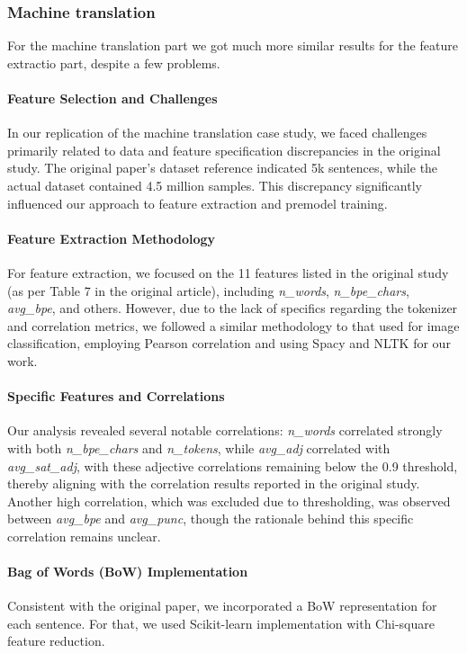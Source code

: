 \subsubsection{Machine translation}
For the machine translation part we got much more similar results for the feature extractio part, despite a few problems.

\paragraph{Feature Selection and Challenges}
In our replication of the machine translation case study, we faced challenges primarily related to data and feature specification discrepancies in the original study. The original paper's dataset reference indicated 5k sentences, while the actual dataset contained 4.5 million samples. This discrepancy significantly influenced our approach to feature extraction and premodel training.

\paragraph{Feature Extraction Methodology}
For feature extraction, we focused on the 11 features listed in the original study (as per Table 7 in the original article), including \textit{n\_words}, \textit{n\_bpe\_chars}, \textit{avg\_bpe}, and others. However, due to the lack of specifics regarding the tokenizer and correlation metrics, we followed a similar methodology to that used for image classification, employing Pearson correlation and using Spacy and NLTK for our work.

\paragraph{Specific Features and Correlations}
Our analysis revealed several notable correlations: \textit{n\_words} correlated strongly with both \textit{n\_bpe\_chars} and \textit{n\_tokens}, while \textit{avg\_adj} correlated with \textit{avg\_sat\_adj}, with these adjective correlations remaining below the 0.9 threshold, thereby aligning with the correlation results reported in the original study. Another high correlation, which was excluded due to thresholding, was observed between \textit{avg\_bpe} and \textit{avg\_punc}, though the rationale behind this specific correlation remains unclear.

\paragraph{Bag of Words (BoW) Implementation}
Consistent with the original paper, we incorporated a BoW representation for each sentence. For that, we used Scikit-learn implementation with Chi-square feature reduction.

